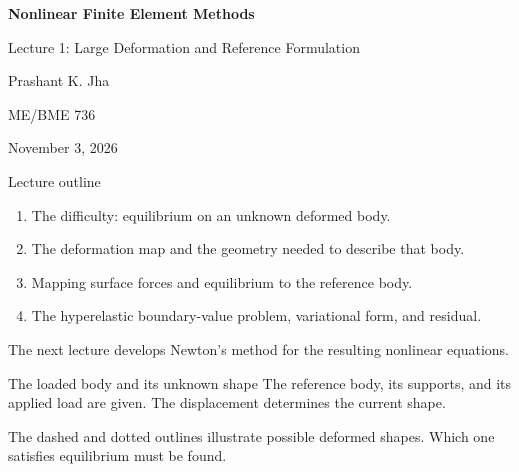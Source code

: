 \documentclass[11pt,aspectratio=169]{beamer}
\newcommand{\bx}{\bm x}
\newcommand{\bX}{\bm X}
\begin{document}
\begin{frame}
\centering\vfill
{\LARGE\bfseries Nonlinear Finite Element Methods\par}
\vspace{0.5cm}
{\Large Lecture 1: Large Deformation and Reference Formulation\par}
\vspace{0.5cm}
Prashant K. Jha\par
ME/BME 736\par
November 3, 2026
\vfill
\end{frame}

\begin{frame}{Lecture outline}
\begin{enumerate}
\item The difficulty: equilibrium on an unknown deformed body.
\item The deformation map and the geometry needed to describe that body.
\item Mapping surface forces and equilibrium to the reference body.
\item The hyperelastic boundary-value problem, variational form, and residual.
\end{enumerate}
\vspace{0.3cm}
The next lecture develops Newton's method for the resulting nonlinear equations.
\end{frame}

\begin{frame}{The loaded body and its unknown shape}
The reference body, its supports, and its applied load are given.
The displacement determines the current shape.
\begin{center}
\end{center}
The dashed and dotted outlines illustrate possible deformed shapes.
Which one satisfies equilibrium must be found.
\end{frame}
\end{document}
